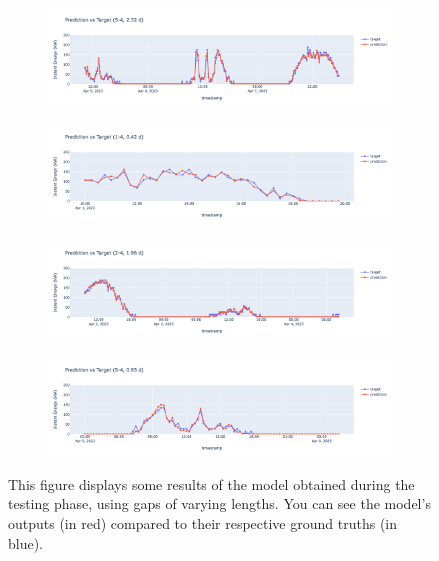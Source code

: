 \begin{figure}[H]
	\centering
	\begin{subfigure}{\textwidth}
		\centering
		\includegraphics[width=.95\textwidth]{chapters/3_models/imgs/gab/eval/gabbuco5.png}
		\caption{}
	\end{subfigure}
	\begin{subfigure}{\textwidth}
		\centering
		\includegraphics[width=.95\textwidth]{chapters/3_models/imgs/gab/eval/gabbuco2.png}
		\caption{}
	\end{subfigure}
	\begin{subfigure}{\textwidth}
		\centering
		\includegraphics[width=.95\textwidth]{chapters/3_models/imgs/gab/eval/gabbuco3.png}
		\caption{}
	\end{subfigure}
	\begin{subfigure}{\textwidth}
		\centering
		\includegraphics[width=.95\textwidth]{chapters/3_models/imgs/gab/eval/gabbuco4.png}
		\caption{}
	\end{subfigure}
	\caption{This figure displays some results of the model obtained during the testing phase, using gaps of varying lengths. You can see the model's outputs (in red) compared to their respective ground truths (in blue).}
	\label{fig:gabsolobuchi}
\end{figure}

